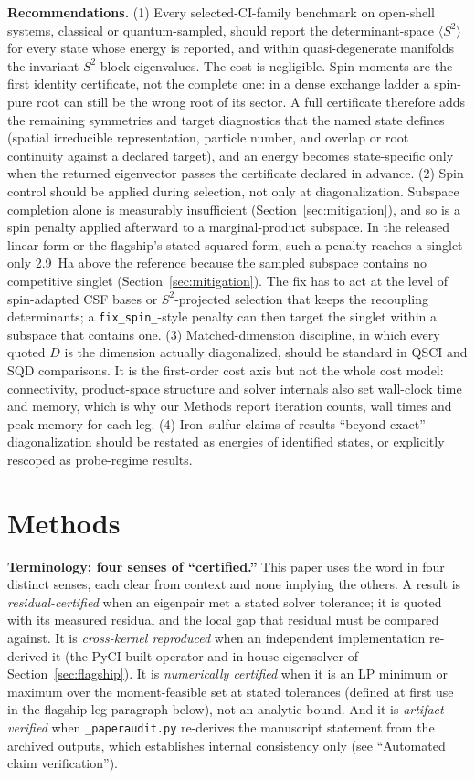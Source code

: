 \documentclass[11pt]{article}
\newcommand{\ssq}{\ensuremath{\langle S^2\rangle}}
\begin{document}
\textbf{Recommendations.} (1) Every selected-CI-family benchmark on open-shell systems, classical or quantum-sampled, should report the determinant-space \ssq{} for every state whose energy is reported, and within quasi-degenerate manifolds the invariant $S^2$-block eigenvalues. The cost is negligible. Spin moments are the first identity certificate, not the complete one: in a dense exchange ladder a spin-pure root can still be the wrong root of its sector. A full certificate therefore adds the remaining symmetries and target diagnostics that the named state defines (spatial irreducible representation, particle number, and overlap or root continuity against a declared target), and an energy becomes state-specific only when the returned eigenvector passes the certificate declared in advance. (2) Spin control should be applied during selection, not only at diagonalization. Subspace completion alone is measurably insufficient (Section~\ref{sec:mitigation}), and so is a spin penalty applied afterward to a marginal-product subspace. In the released linear form or the flagship's stated squared form, such a penalty reaches a singlet only 2.9~Ha above the reference because the sampled subspace contains no competitive singlet (Section~\ref{sec:mitigation}). The fix has to act at the level of spin-adapted CSF bases or $S^2$-projected selection that keeps the recoupling determinants; a \texttt{fix\_spin\_}-style penalty can then target the singlet within a subspace that contains one. (3) Matched-dimension discipline, in which every quoted $D$ is the dimension actually diagonalized, should be standard in QSCI and SQD comparisons. It is the first-order cost axis but not the whole cost model: connectivity, product-space structure and solver internals also set wall-clock time and memory, which is why our Methods report iteration counts, wall times and peak memory for each leg. (4) Iron--sulfur claims of results ``beyond exact'' diagonalization should be restated as energies of identified states, or explicitly rescoped as probe-regime results.

\FloatBarrier
\section{Methods}

\textbf{Terminology: four senses of ``certified.''} This paper uses the word in four distinct senses, each clear from context and none implying the others. A result is \emph{residual-certified} when an eigenpair met a stated solver tolerance; it is quoted with its measured residual and the local gap that residual must be compared against. It is \emph{cross-kernel reproduced} when an independent implementation re-derived it (the PyCI-built operator and in-house eigensolver of Section~\ref{sec:flagship}). It is \emph{numerically certified} when it is an LP minimum or maximum over the moment-feasible set at stated tolerances (defined at first use in the flagship-leg paragraph below), not an analytic bound. And it is \emph{artifact-verified} when \texttt{\_paperaudit.py} re-derives the manuscript statement from the archived outputs, which establishes internal consistency only (see ``Automated claim verification'').
\end{document}
